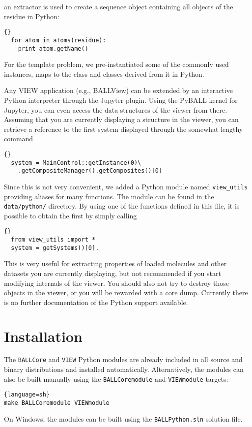 \noindent
an  extractor is used to create a sequence object containing
all objects of the residue in Python:

\begin{lstlisting}{}
  for atom in atoms(residue):
    print atom.getName()
\end{lstlisting}

For the template problem, we pre-instantiated some of the 
commonly used instances, \eg {} maps to the 
 class and classes derived from it in Python.

Any VIEW application (e.g., BALLView) can be extended by an interactive Python
interpreter through the Jupyter plugin. Using the PyBALL kernel for Jupyter, 
you can even access the data structures of the viewer from there. Assuming that
you are currently displaying a structure in the viewer, you can retrieve a
reference to the first system displayed through the somewhat lengthy command

\begin{lstlisting}{}
  system = MainControl::getInstance(0)\
    .getCompositeManager().getComposites()[0]
\end{lstlisting}

\noindent
Since this is not very convenient, we added a Python module named \texttt{view\_utils}
providing aliases for many functions. The module can be found in the \texttt{data/python/}
directory. By using one of the functions defined in this file, it is possible to obtain
the first \class{System} by simply calling

\begin{lstlisting}{}
  from view_utils import *
  system = getSystems()[0].
\end{lstlisting}

\noindent
This is very useful for extracting properties of loaded molecules and other 
datasets you are currently displaying, but not recommended if you start 
modifying internals of the viewer. You should also not try to destroy those 
objects in the viewer, or you will be rewarded with a core dump. Currently 
there is no further documentation of the Python support available.
		

\section{Installation}

The \texttt{BALLCore} and \texttt{VIEW} Python modules are already included
in all source and  binary distributions and installed automatically.
Alternatively, the modules can also be built manually using the
\texttt{BALLCoremodule} and \texttt{VIEWmodule} targets:
\begin{lstlisting}{language=sh}
make BALLCoremodule VIEWmodule
\end{lstlisting}
On Windows, the modules can be built using the \texttt{BALLPython.sln}
solution file.

